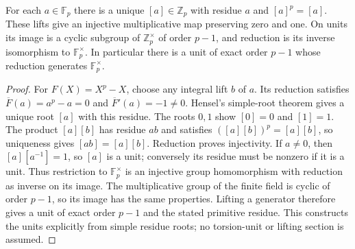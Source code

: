 \begin{lemma}
\label{ft:padic-tame-units}
\leanok
For each $a\in\mathbb F_p$ there is a unique $[a]\in\mathbb Z_p$
with residue $a$ and $[a]^p=[a]$. These lifts give an injective
multiplicative map preserving zero and one. On units its image is a
cyclic subgroup of $\mathbb Z_p^\times$ of order $p-1$, and reduction
is its inverse isomorphism to $\mathbb F_p^\times$. In particular
there is a unit of exact order $p-1$ whose reduction generates
$\mathbb F_p^\times$.
\end{lemma}
\begin{proof}
For $F(X)=X^p-X$, choose any integral lift $b$ of $a$. Its reduction
satisfies $\overline{F}(a)=a^p-a=0$ and
$\overline{F}'(a)=-1\ne0$. Hensel's simple-root theorem gives a unique
root $[a]$ with this residue. The roots $0,1$ show $[0]=0$ and $[1]=1$.
The product $[a][b]$ has residue $ab$ and satisfies
$([a][b])^p=[a][b]$, so uniqueness gives $[ab]=[a][b]$.
Reduction proves injectivity. If $a\ne0$, then
$[a][a^{-1}]=1$, so $[a]$ is a unit; conversely its residue must be
nonzero if it is a unit. Thus restriction to $\mathbb F_p^\times$
is an injective group homomorphism with reduction as inverse on its
image. The multiplicative group of the finite field is cyclic of order
$p-1$, so its image has the same properties. Lifting a generator
therefore gives a unit of exact order $p-1$ and the stated primitive
residue. This constructs the units explicitly from simple residue roots;
no torsion-unit or lifting section is assumed.
\end{proof}

